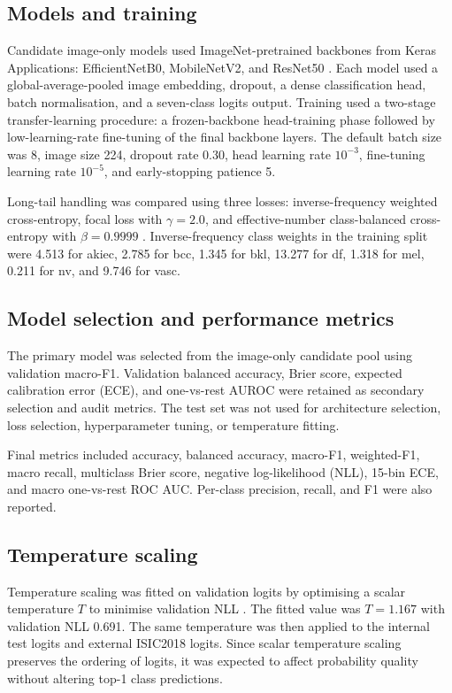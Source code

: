 \documentclass[11pt,a4paper]{article}
\newcommand{\isic}{ISIC2018}
\begin{document}
\subsection{Models and training}

Candidate image-only models used ImageNet-pretrained backbones from Keras Applications: EfficientNetB0, MobileNetV2, and ResNet50 \citep{he2016resnet,tan2019efficientnet,howard2017mobilenets,keras2024applications}. Each model used a global-average-pooled image embedding, dropout, a dense classification head, batch normalisation, and a seven-class logits output. Training used a two-stage transfer-learning procedure: a frozen-backbone head-training phase followed by low-learning-rate fine-tuning of the final backbone layers. The default batch size was 8, image size 224, dropout rate 0.30, head learning rate $10^{-3}$, fine-tuning learning rate $10^{-5}$, and early-stopping patience 5.

Long-tail handling was compared using three losses: inverse-frequency weighted cross-entropy, focal loss with $\gamma=2.0$, and effective-number class-balanced cross-entropy with $\beta=0.9999$ \citep{lin2017focal,cui2019classbalanced}. Inverse-frequency class weights in the training split were 4.513 for akiec, 2.785 for bcc, 1.345 for bkl, 13.277 for df, 1.318 for mel, 0.211 for nv, and 9.746 for vasc.

\subsection{Model selection and performance metrics}

The primary model was selected from the image-only candidate pool using validation macro-F1. Validation balanced accuracy, Brier score, expected calibration error (ECE), and one-vs-rest AUROC were retained as secondary selection and audit metrics. The test set was not used for architecture selection, loss selection, hyperparameter tuning, or temperature fitting.

Final metrics included accuracy, balanced accuracy, macro-F1, weighted-F1, macro recall, multiclass Brier score, negative log-likelihood (NLL), 15-bin ECE, and macro one-vs-rest ROC AUC. Per-class precision, recall, and F1 were also reported.

\subsection{Temperature scaling}

Temperature scaling was fitted on validation logits by optimising a scalar temperature $T$ to minimise validation NLL \citep{guo2017calibration}. The fitted value was $T=1.167$ with validation NLL 0.691. The same temperature was then applied to the internal test logits and external \isic{} logits. Since scalar temperature scaling preserves the ordering of logits, it was expected to affect probability quality without altering top-1 class predictions.
\end{document}
